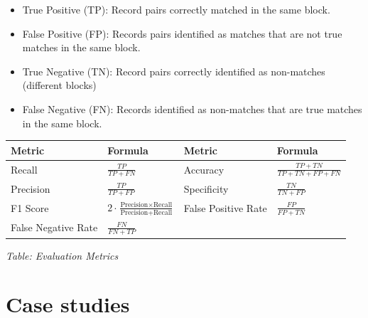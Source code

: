 \begin{itemize}
\tightlist
\item
  True Positive (TP): Record pairs correctly matched in the same block.
\item
  False Positive (FP): Records pairs identified as matches that are not true matches in the same block.
\item
  True Negative (TN): Record pairs correctly identified as non-matches (different blocks)
\item
  False Negative (FN): Records identified as non-matches that are true matches in the same block.
\end{itemize}

\begin{longtable}[]{@{}
  >{\raggedright\arraybackslash}p{}
  >{\raggedright\arraybackslash}p{}
  >{\raggedright\arraybackslash}p{}
  >{\raggedright\arraybackslash}p{}@{}}
\toprule\noalign{}
\begin{minipage}[b]{\linewidth}\raggedright
\textbf{Metric}
\end{minipage} & \begin{minipage}[b]{\linewidth}\raggedright
\textbf{Formula}
\end{minipage} & \begin{minipage}[b]{\linewidth}\raggedright
\textbf{Metric}
\end{minipage} & \begin{minipage}[b]{\linewidth}\raggedright
\textbf{Formula}
\end{minipage} \\
\midrule\noalign{}
\endhead
\bottomrule\noalign{}
\endlastfoot
Recall & \(\frac{TP}{TP + FN}\) & Accuracy & \(\frac{TP + TN}{TP + TN + FP + FN}\) \\
Precision & \(\frac{TP}{TP + FP}\) & Specificity & \(\frac{TN}{TN + FP}\) \\
F1 Score & \(2 \cdot \frac{\text{Precision} \times \text{Recall}}{\text{Precision} + \text{Recall}}\) & False Positive Rate & \(\frac{FP}{FP + TN}\) \\
False Negative Rate & \(\frac{FN}{FN + TP}\) & & \\
\end{longtable}

\emph{Table: Evaluation Metrics}

\section{Case studies}\label{case-studies}


